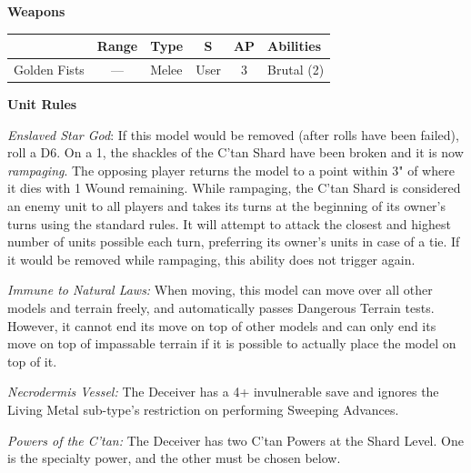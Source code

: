 \begin{minipage}[t]{0.72\textwidth}
	\vspace*{2em}
	\textbf{Weapons}
	
	\begin{tabular}{L{90 pt} c C{40pt} *{2}{c} >{\raggedright\arraybackslash}p{130pt}}
		& Range & Type & S & AP & Abilities \\
		\hline
		Golden Fists & — & Melee & User & 3 & Brutal (2) \\
	\end{tabular}
	
	\vspace*{2em}
	\textbf{Unit Rules}
	
	\textit{Enslaved Star God}: If this model would be removed (after  rolls have been failed), roll a D6. On a 1, the shackles of the C'tan Shard have been broken and it is now \textit{rampaging}. The opposing player returns the model to a point within 3" of where it dies with 1 Wound remaining. While rampaging, the C'tan Shard is considered an enemy unit to all players and takes its turns at the beginning of its owner's turns using the standard rules. It will attempt to attack the closest and highest number of units possible each turn, preferring its owner's units in case of a tie. If it would be removed while rampaging, this ability does not trigger again.
	
	\textit{Immune to Natural Laws:} When moving, this model can move over all other models and terrain freely, and automatically passes Dangerous Terrain tests. However, it cannot end its move on top of other models and can only end its move on top of impassable terrain if it is possible to actually place the model on top of it.
		
	\textit{Necrodermis Vessel:} The Deceiver has a 4+ invulnerable save and ignores the Living Metal sub-type's restriction on performing Sweeping Advances.
	
	\textit{Powers of the C'tan:} The Deceiver has two C'tan Powers at the Shard Level. One is the  specialty power, and the other must be chosen below.
	

\end{minipage}
